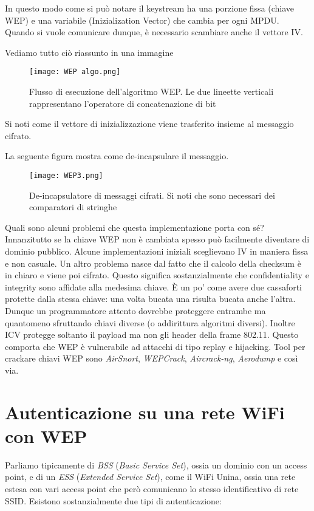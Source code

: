 \documentclass[14pt]{extreport}
\begin{document}
    In questo modo come si può notare il keystream ha una porzione fissa (chiave WEP) e una variabile (Inizialization Vector) che cambia per ogni MPDU. Quando si vuole comunicare dunque, è necessario scambiare anche il vettore IV.





Vediamo tutto ciò riassunto in una immagine

\begin{figure}[H]
    \centering
    \texttt{[image: WEP algo.png]}
    \caption{Flusso di esecuzione dell'algoritmo WEP. Le due lineette verticali rappresentano l'operatore di concatenazione di bit}
    \label{WEP2}
\end{figure}

Si noti come il vettore di inizializzazione viene trasferito insieme al messaggio cifrato.

La seguente figura mostra come de-incapsulare il messaggio.

\begin{figure}[H]
    \centering
    \texttt{[image: WEP3.png]}
    \caption{De-incapsulatore di messaggi cifrati. Si noti che sono necessari dei comparatori di stringhe}
    \label{WEP2}
\end{figure}

Quali sono alcuni problemi che questa implementazione porta con sé? Innanzitutto se la chiave WEP non è cambiata spesso può facilmente diventare di dominio pubblico. Alcune implementazioni iniziali sceglievano IV in maniera fissa e non casuale. 
Un altro problema nasce dal fatto che il calcolo della checksum è in chiaro e viene poi cifrato. Questo significa sostanzialmente che confidentiality e integrity sono affidate alla medesima chiave. È un po' come avere due cassaforti protette dalla stessa chiave: una volta bucata una risulta bucata anche l'altra. Dunque un programmatore attento dovrebbe proteggere entrambe ma quantomeno sfruttando chiavi diverse (o addirittura algoritmi diversi). Inoltre ICV protegge soltanto il payload ma non gli header della frame 802.11. Questo comporta che WEP è vulnerabile ad attacchi di tipo replay e hijacking. Tool per crackare chiavi WEP sono \textit{AirSnort}, \textit{WEPCrack}, \textit{Aircrack-ng}, \textit{Aerodump} e così via.


\section{Autenticazione su una rete WiFi con WEP}
Parliamo tipicamente di \textit{BSS} (\textit{Basic Service Set}), ossia un dominio con un access point, e di un \textit{ESS} (\textit{Extended Service Set}), come il WiFi Unina, ossia una rete estesa con vari access point che però comunicano lo stesso identificativo di rete SSID. Esistono sostanzialmente due tipi di autenticazione:
\end{document}
